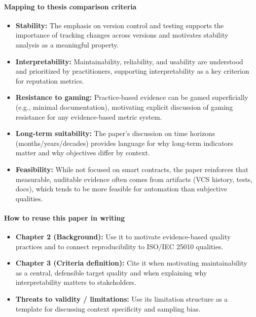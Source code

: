 \documentclass[11pt,a4paper]{article}
\begin{document}
\paragraph{Mapping to thesis comparison criteria}
\begin{itemize}[leftmargin=*]
  \item \textbf{Stability:} The emphasis on version control and testing supports the importance of tracking changes across versions and motivates stability analysis as a meaningful property.
  \item \textbf{Interpretability:} Maintainability, reliability, and usability are understood and prioritized by practitioners, supporting interpretability as a key criterion for reputation metrics.
  \item \textbf{Resistance to gaming:} Practice-based evidence can be gamed superficially (e.g., minimal documentation), motivating explicit discussion of gaming resistance for any evidence-based metric system.
  \item \textbf{Long-term suitability:} The paper's discussion on time horizons (months/years/decades) provides language for why long-term indicators matter and why objectives differ by context.
  \item \textbf{Feasibility:} While not focused on smart contracts, the paper reinforces that measurable, auditable evidence often comes from artifacts (VCS history, tests, docs), which tends to be more feasible for automation than subjective qualities.
\end{itemize}

\paragraph{How to reuse this paper in writing}
\begin{itemize}[leftmargin=*]
  \item \textbf{Chapter 2 (Background):} Use it to motivate evidence-based quality practices and to connect reproducibility to ISO/IEC 25010 qualities.
  \item \textbf{Chapter 3 (Criteria definition):} Cite it when motivating maintainability as a central, defensible target quality and when explaining why interpretability matters to stakeholders.
  \item \textbf{Threats to validity / limitations:} Use its limitation structure as a template for discussing context specificity and sampling bias.
\end{itemize}
\end{document}
